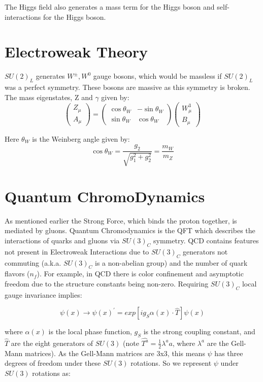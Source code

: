 The Higgs field also generates a mass term for the Higgs boson and self-interactions for the Higgs boson. 
\section{Electroweak Theory}
$SU(2)_{L}$ generates $W^{\pm}, W^{0}$ gauge bosons, which would be massless if $SU(2)_{L}$ was a perfect symmetry. These bosons are massive as this symmetry is broken. The mass eigenstates, Z and $\gamma$ given by: 
\begin{equation}
\begin{pmatrix} Z_{\mu} \\ A_{\mu} \end{pmatrix} = \begin{pmatrix} \cos \theta_{W} & -\sin \theta_{W} \\ \sin \theta_{W} & \cos \theta_{W} \end{pmatrix} \begin{pmatrix} W^{3}_{\mu} \\ B_{\mu} \end{pmatrix}
\end{equation} 

Here $\theta_{W}$ is the Weinberg angle given by: 
\begin{equation}
\cos\theta_{W}=\frac{g_{2}}{\sqrt{g_{1}^{2}+g_{2}^{2}}} = \frac{m_{W}}{m_{Z}}
\end{equation}
\section{Quantum ChromoDynamics}
As mentioned earlier the Strong Force, which binds the proton together, is mediated by gluons. Quantum Chromodynamics is the QFT which describes the interactions of quarks and gluons via $SU(3)_C$ symmetry. QCD contains features not present in Electroweak Interactions due to $SU(3)_C$ generators not commuting (a.k.a. $SU(3)_C$ is a non-abelian group) and the number of quark flavors ($n_{f}$). For example, in QCD there is color confinement and asymptotic freedom due to the structure constants being non-zero. Requiring $SU(3)_C$ local gauge invariance implies:

\begin{equation}
\psi(x) \rightarrow \psi(x)^{'} = exp[ig_{S}\alpha(x)\cdot\hat{T}]\psi(x)
\end{equation}

where $\alpha(x)$ is the local phase function, $g_{S}$ is the strong coupling constant, and $\hat{T}$ are the eight generators of $SU(3)$ (note $\hat{T^{a}}=\frac{1}{2}\lambda^{a} a$, where $\lambda^{a}$ are the Gell-Mann matrices). As the Gell-Mann matrices are 3x3, this means $\psi$ has three degrees of freedom under these $SU(3)$ rotations. So we represent $\psi$ under $SU(3)$ rotations as:

